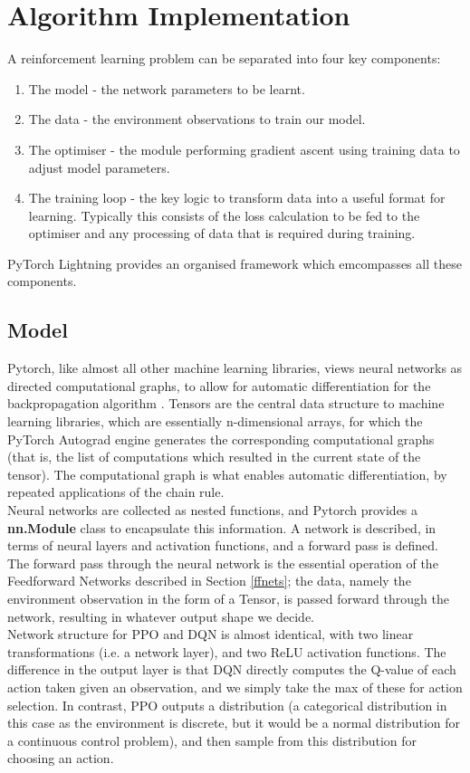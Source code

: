\documentclass[12pt]{article}
\begin{document}
\section{Algorithm Implementation}\label{algo}
A reinforcement learning problem can be separated into four key components:
\begin{enumerate}
    \item The model -  the network parameters to be learnt.
    \item The data - the environment observations to train our model.
    \item The optimiser - the module performing gradient ascent using training data to adjust model parameters.
    \item The training loop - the key logic to transform data into a useful format for learning. Typically this consists of the loss calculation to be fed to the optimiser and any processing of data that is required during training. 
\end{enumerate}
PyTorch Lightning provides an organised framework which emcompasses all these components.
\subsection{Model}
Pytorch, like almost all other machine learning libraries, views neural networks as directed computational graphs, to allow for automatic differentiation for the backpropagation algorithm \autocite{paszke2017automatic,baydin2018automatic}. Tensors are the central data structure to machine learning libraries, which are essentially n-dimensional arrays, for which the PyTorch Autograd engine generates the corresponding computational graphs (that is, the list of computations which resulted in the current state of the tensor). The computational graph is what enables automatic differentiation, by repeated applications of the chain rule. \\\newline Neural networks are collected as nested functions, and Pytorch provides a \textbf{nn.Module} class to encapsulate this information. A network is described, in terms of neural layers and activation functions, and a forward pass is defined. The forward pass through the neural network is the essential operation of the Feedforward Networks described in Section \ref{ffnets}; the data, namely the environment observation in the form of a Tensor, is passed forward through the network, resulting in whatever output shape we decide. \\\newline
Network structure for PPO and DQN is almost identical, with two linear transformations (i.e. a network layer), and two ReLU activation functions. The difference in the output layer is that DQN directly computes the Q-value of each action taken given an observation, and we simply take the max of these for action selection. In contrast, PPO outputs a distribution (a categorical distribution in this case as the environment is discrete, but it would be a normal distribution for a continuous control problem), and then sample from this distribution for choosing an action. 
\end{document}
